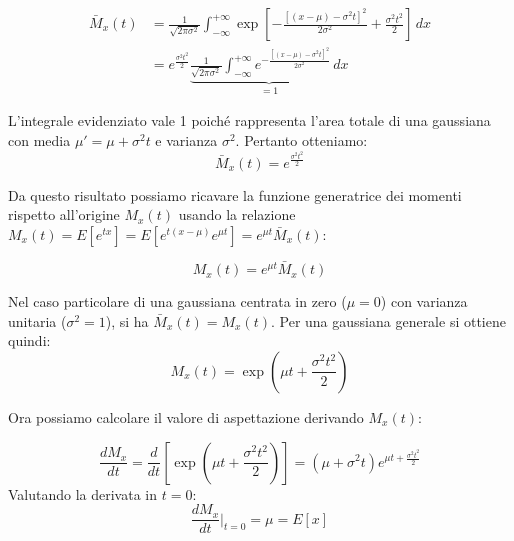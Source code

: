 \documentclass{article}
\theoremstyle{remark}
\begin{document}
\begin{equation}
\begin{aligned}
\bar{M}_x(t) &= \frac{1}{\sqrt{2\pi \sigma^2}} \int_{-\infty}^{+\infty}  \exp\left[ -\frac{\left[ (x-\mu) - \sigma^2 t \right]^2}{2\sigma^2} + \frac{\sigma^2 t^2}{2} \right] \, dx \\
&= e^{\frac{\sigma^2 t^2}{2}} \underbrace{\frac{1}{\sqrt{2\pi \sigma^2}} \int_{-\infty}^{+\infty} e^{-\frac{\left[ (x-\mu) - \sigma^2 t \right]^2}{2\sigma^2}} \, dx}_{=1}
\end{aligned}
\end{equation}

L'integrale evidenziato vale 1 poiché rappresenta l'area totale di una gaussiana con media $\mu' = \mu + \sigma^2 t$ e varianza $\sigma^2$. Pertanto otteniamo:
\begin{equation} \boxed{
\bar{M}_x(t) = e^{\frac{\sigma^2 t^2}{2}}}
\end{equation}

Da questo risultato possiamo ricavare la funzione generatrice dei momenti rispetto all'origine $M_x(t)$ usando la relazione $M_x(t) = E[e^{tx}] = E[e^{t(x-\mu)} e^{\mu t}] = e^{\mu t} \bar{M}_x(t)$:

\begin{equation}
M_x(t) = e^{\mu t} \bar{M}_x(t)
\end{equation}

Nel caso particolare di una gaussiana centrata in zero ($\mu=0$) con varianza unitaria ($\sigma^2=1$), si ha $\bar{M}_x(t)=M_x(t)$.
Per una gaussiana generale si ottiene quindi:
\begin{equation} \boxed{
M_x(t) = \exp\left(\mu t + \frac{\sigma^2 t^2}{2}\right)}
\end{equation}

Ora possiamo calcolare il valore di aspettazione derivando $M_x(t)$:

\begin{equation}
\frac{d M_x}{dt} = \frac{d}{dt} \left[ \exp\left( \mu t + \frac{\sigma^2 t^2}{2} \right) \right] = \left( \mu + \sigma^2 t \right) e^{\mu t + \frac{\sigma^2 t^2}{2}}
\end{equation}
Valutando la derivata in $t = 0$:
\begin{equation}
\frac{d M_x}{dt} \bigg\rvert_{t=0} = \mu = E[x] 
\end{equation}
\end{document}
